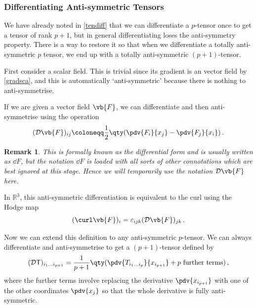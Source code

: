 \documentclass{article}
\theoremstyle{plain}\theoremheaderfont{\normalfont\itshape}\theorembodyfont{\rmfamily}\theoremseparator{.}\newtheorem*{rem}{Remark}\newtheorem*{ex}{Example}\newtheorem*{proof}{Proof}\newtheorem*{altp}{Alternative proof}
\theoremstyle{plain}\theoremheaderfont{\normalfont\bfseries}\theorembodyfont{\rmfamily}\theoremseparator{.}\newtheorem{thm}{Theorem}[section]\newtheorem{lem}[thm]{Lemma}\newtheorem{prop}[thm]{Proposition}\newtheorem*{cor}{Corollary}\newtheorem{defn}[thm]{Definition}\newtheorem{clm}[thm]{Claim}\newtheorem{clminproof}{Claim}
\theoremstyle{break}\theoremheaderfont{\normalfont\itshape}\theorembodyfont{\rmfamily}\theoremseparator{.\medskip}\newtheorem*{proofskip}{Proof}\newtheorem*{exs}{Examples}\newtheorem*{rems}{Remarks}
\theoremstyle{break}\theoremheaderfont{\normalfont\bfseries}\theorembodyfont{\rmfamily}\theoremseparator{.\medskip}\newtheorem{lemskip}[thm]{Lemma}\newtheorem{defnskip}[thm]{Definition}\newtheorem{propskip}[thm]{Proposition}\newtheorem{thmskip}[thm]{Theorem}
\numberwithin{equation}{section}
\begin{document}
	\subsubsection{Differentiating Anti-symmetric Tensors}
	We have already noted in \cref{tendiff} that we can differentiate a \(p\)-tensor once to get a tensor of rank \(p+1\), but in general differentiating loses the anti-symmetry property. There is a way to restore it so that when we differentiate a totally anti-symmetric \(p\) tensor, we end up with a totally anti-symmetric \((p+1)\)-tensor.

	First consider a scalar field. This is trivial since its gradient is an vector field by \cref{gradsca}, and this is	automatically `anti-symmetric' because there is nothing to anti-symmetrise.

	If we are given a vector field \(\vb{F}\), we can differentiate and then anti-symmetrise using the operation
	\[(\mathcal{D}\vb{F})_{ij}\coloneqq\frac{1}{2}\qty(\pdv{F_i}{x_j}-\pdv{F_j}{x_i})\,.\]
	\begin{rem}
		This is formally known as the \textit{differential form} and is usually written as \(\dd{F}\), but the notation \(\dd{F}\) is loaded with all sorts of other connotations which are best ignored at this stage. Hence we will temporarily use the notation \(\mathcal{D}\vb{F}\) here.
	\end{rem}

	In \(\mathbb{R}^3\), this anti-symmetric differentiation is equivalent to the curl using the Hodge map
	\[(\curl\vb{F})_i=\varepsilon_{ijk}(\mathcal{D}\vb{F})_{jk}\,.\]

	Now we can extend this definition to any anti-symmetric \(p\)-tensor. We can always differentiate and anti-symmetrise to get a \((p+1)\)-tensor defined by
	\[(\mathcal{D}\mathsf{T})_{i_1\dots i_{p+1}}=\frac{1}{p+1}\qty(\pdv{T_{i_1\dots i_p}}{x_{i_{p+1}}}+p\text{ further terms})\,,\]
	where the further terms involve replacing the derivative \(\pdv{x_{i_{p+1}}}\) with one of the other coordinates \(\pdv{x_j}\) so that the whole derivative is fully anti-symmetric.
\end{document}
